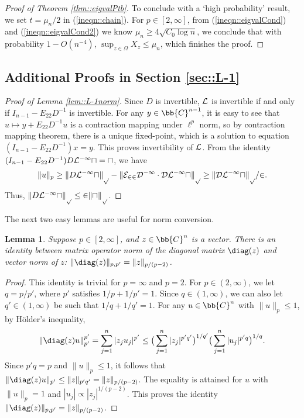 \documentclass[12pt]{article}%
\theoremstyle{plain}%
\newtheorem{lem}{Lemma}[section]
\theoremstyle{remark}
\begin{document}
\begin{proof}[Proof of Theorem \ref{thm::eigvalPtb}]
To conclude with a `high probability' result, we set $t = \mu_n/2$ in (\ref{ineqn::chain}). For $p \in [2,\infty]$, from (\ref{ineqn::eigvalCond}) and (\ref{ineqn::eigvalCond2}) we know $\mu_n \ge 4 \sqrt{C_0\log n}$, we conclude that with probability $1 - O(n^{-4})$, $\sup_{z \in \Omega} X_z \le \mu_n$, which finishes the proof.

\end{proof}


\subsection{Additional Proofs in Section \ref{sec::L-1}}

\begin{proof}[Proof of Lemma \ref{lem::L-1norm}]
Since $D$ is invertible, $\cal{L}$ is invertible if and only if $I_{n-1} - E_{22} D^{-1}$ is invertible. For any $y \in \bb{C}^{n-1}$, it is easy to see that $u \mapsto y + E_{22} D^{-1} u$ is a contraction mapping under $\ell^p$ norm, so by contraction mapping theorem, there is a unique fixed-point, which is a solution to equation $(I_{n-1} - E_{22} D^{-1})x = y$. This proves invertibility of $\cal{L}$. 
From the identity $(I_{n-1} - E_{22} D^{-1} ) D \cal{L}^{-1} u = u$, we have
\begin{equation*}
\| u \|_p \ge \| D \cal{L}^{-1} u \|_p - \| E_{22}D^{-1} \cdot D\cal{L}^{-1} u \|_p \ge \| D \cal{L}^{-1} u \|_p / 2.
\end{equation*}
Thus, $\| D \cal{L}^{-1} u \|_p \le 2\|u\|_p$.
\end{proof}

The next two easy lemmas are useful for norm conversion.

\begin{lem}\label{lem::diagMatNorm}
Suppose $p \in [2,\infty]$, and $z \in \bb{C}^n$ is a vector. There is an identity between matrix operator norm of the diagonal matrix $\diag(z)$ and vector norm of $z$: $\| \diag(z) \|_{p,p'} = \| z \|_{p/(p-2)}$.
\end{lem}
\begin{proof}
This identity is trivial for $p=\infty$ and $p=2$. For $p \in (2,\infty)$, we let $q = p/p'$, where $p'$ satisfies $1/p + 1/p' = 1$. Since $q \in (1,\infty)$, we can also let $q' \in (1,\infty)$ be such that $1/q + 1/q' = 1$. For any $u \in \bb{C}^n$ with $\| u \|_p \le 1$, by H\"{o}lder's inequality,
\begin{equation*}
\| \diag(z) u \|_{p'}^{p'} = \sum_{j=1}^n |z_j u_j |^{p'} \le \big( \sum_{j=1}^n |z_j|^{p'q'} \big)^{1/q'} \big( \sum_{j=1}^n |u_j|^{p'q} \big)^{1/q}.
\end{equation*}
Since $p'q = p$ and $\| u \|_p \le 1$, it follows that $\| \diag(z) u \|_{p'} \le \| z \|_{p'q'} = \| z \|_{p/(p-2)}$. The equality is attained for $u$ with $\| u \|_p = 1$ and $|u_j| \propto |z_j|^{1/(p-2)}$. This proves the identity $\| \diag(z) \|_{p,p'} = \| z \|_{p/(p-2)}$.
\end{proof}
\end{document}
